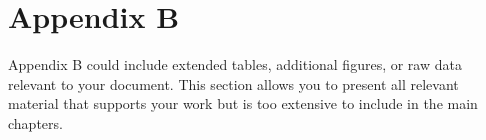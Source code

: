 \chapter*{Appendix B}

Appendix B could include extended tables, additional figures, or raw data relevant to your document. This section allows you to present all relevant material that supports your work but is too extensive to include in the main chapters.
